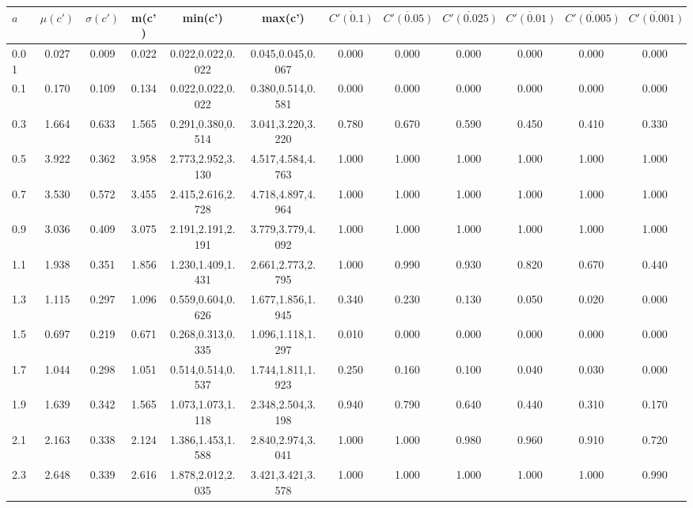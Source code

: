 \begin{table*}[h!]
\begin{center}
\begin{tabular}{| l | c | c | c | c | c | c | c | c | c | c | c |}\hline
$a$ & $\mu(c')$ & $\sigma(c')$ & m(c') & min(c') & max(c') & $\overline{C'(0.1)}$ & $\overline{C'(0.05)}$ & $\overline{C'(0.025)}$ & $\overline{C'(0.01)}$ & $\overline{C'(0.005)}$ & $\overline{C'(0.001)}$ \\\hline
0.01 & 0.027 & 0.009 & 0.022 & 0.022,0.022,0.022 & 0.045,0.045,0.067  & 0.000  & 0.000  & 0.000  & 0.000  & 0.000  & 0.000 \\\hline
0.1 & 0.170 & 0.109 & 0.134 & 0.022,0.022,0.022 & 0.380,0.514,0.581  & 0.000  & 0.000  & 0.000  & 0.000  & 0.000  & 0.000 \\\hline
0.3 & 1.664 & 0.633 & 1.565 & 0.291,0.380,0.514 & 3.041,3.220,3.220  & 0.780  & 0.670  & 0.590  & 0.450  & 0.410  & 0.330 \\\hline
0.5 & 3.922 & 0.362 & 3.958 & 2.773,2.952,3.130 & 4.517,4.584,4.763  & 1.000  & 1.000  & 1.000  & 1.000  & 1.000  & 1.000 \\\hline
0.7 & 3.530 & 0.572 & 3.455 & 2.415,2.616,2.728 & 4.718,4.897,4.964  & 1.000  & 1.000  & 1.000  & 1.000  & 1.000  & 1.000 \\\hline
0.9 & 3.036 & 0.409 & 3.075 & 2.191,2.191,2.191 & 3.779,3.779,4.092  & 1.000  & 1.000  & 1.000  & 1.000  & 1.000  & 1.000 \\\hline
1.1 & 1.938 & 0.351 & 1.856 & 1.230,1.409,1.431 & 2.661,2.773,2.795  & 1.000  & 0.990  & 0.930  & 0.820  & 0.670  & 0.440 \\\hline
1.3 & 1.115 & 0.297 & 1.096 & 0.559,0.604,0.626 & 1.677,1.856,1.945  & 0.340  & 0.230  & 0.130  & 0.050  & 0.020  & 0.000 \\\hline
1.5 & 0.697 & 0.219 & 0.671 & 0.268,0.313,0.335 & 1.096,1.118,1.297  & 0.010  & 0.000  & 0.000  & 0.000  & 0.000  & 0.000 \\\hline
1.7 & 1.044 & 0.298 & 1.051 & 0.514,0.514,0.537 & 1.744,1.811,1.923  & 0.250  & 0.160  & 0.100  & 0.040  & 0.030  & 0.000 \\\hline
1.9 & 1.639 & 0.342 & 1.565 & 1.073,1.073,1.118 & 2.348,2.504,3.198  & 0.940  & 0.790  & 0.640  & 0.440  & 0.310  & 0.170 \\\hline
2.1 & 2.163 & 0.338 & 2.124 & 1.386,1.453,1.588 & 2.840,2.974,3.041  & 1.000  & 1.000  & 0.980  & 0.960  & 0.910  & 0.720 \\\hline
2.3 & 2.648 & 0.339 & 2.616 & 1.878,2.012,2.035 & 3.421,3.421,3.578  & 1.000  & 1.000  & 1.000  & 1.000  & 1.000  & 0.990 \\\hline

\end{tabular}
\end{center}
\end{table*}
